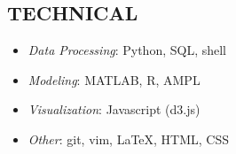 \documentclass[margin]{res}
\begin{document}
\begin{resume}
%


\section{TECHNICAL}

\begin{minipage}[t]{0.5\textwidth}
\begin{itemize}
 \item 
    \textit{Data Processing}: Python, SQL, shell  
\item
\textit{Modeling}: MATLAB, R, AMPL
\end{itemize}
\end{minipage}
\begin{minipage}[t]{0.5\textwidth}
\begin{itemize}
\item
    \textit{Visualization}: Javascript (d3.js)
\item
    \textit{Other}: git, vim, \LaTeX, HTML, CSS
\end{itemize}
\end{minipage}
\vspace{-2mm}



\end{resume}
\end{document}
